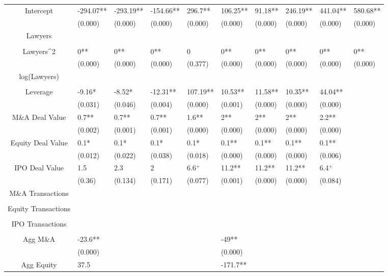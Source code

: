 \documentclass{article}
\begin{document}
\begin{table}[H]
\begin{tabular}{|clllllllll|}
Intercept & -294.07** & -293.19** & -154.66** & 296.7** & 106.25** & 91.18** & 246.19** & 441.04** & 580.68** \\ 
   & (0.000) & (0.000) & (0.000) & (0.000) & (0.000) & (0.000) & (0.000) & (0.000) & (0.000) \\ 
  Lawyers &  &  &  &  &  &  &  &  &  \\ 
   &  &  &  &  &  &  &  &  &  \\ 
  Lawyers^2 & 0** & 0** & 0** & 0 & 0** & 0** & 0** & 0** & 0** \\ 
   & (0.000) & (0.000) & (0.000) & (0.377) & (0.000) & (0.000) & (0.000) & (0.000) & (0.000) \\ 
  log(Lawyers) &  &  &  &  &  &  &  &  &  \\ 
   &  &  &  &  &  &  &  &  &  \\ 
  Leverage & -9.16* & -8.52* & -12.31** & 107.19** & 10.53** & 11.58** & 10.35** & 44.04** &  \\ 
   & (0.031) & (0.046) & (0.004) & (0.000) & (0.001) & (0.000) & (0.000) & (0.000) &  \\ 
  M\&A Deal Value & 0.7** & 0.7** & 0.7** & 1.6** & 2** & 2** & 2** & 2.2** &  \\ 
   & (0.002) & (0.001) & (0.001) & (0.000) & (0.000) & (0.000) & (0.000) & (0.000) &  \\ 
  Equity Deal Value & 0.1* & 0.1* & 0.1* & 0.1* & 0.1** & 0.1** & 0.1** & 0.1** &  \\ 
   & (0.012) & (0.022) & (0.038) & (0.018) & (0.000) & (0.000) & (0.000) & (0.006) &  \\ 
  IPO Deal Value & 1.5 & 2.3 & 2 & 6.6$^{+}$ & 11.2** & 11.2** & 11.2** & 6.4$^{+}$ &  \\ 
   & (0.36) & (0.134) & (0.171) & (0.077) & (0.001) & (0.000) & (0.000) & (0.084) &  \\ 
  M\&A Transactions &  &  &  &  &  &  &  &  &  \\ 
   &  &  &  &  &  &  &  &  &  \\ 
  Equity Transactions &  &  &  &  &  &  &  &  &  \\ 
   &  &  &  &  &  &  &  &  &  \\ 
  IPO Transactions &  &  &  &  &  &  &  &  &  \\ 
   &  &  &  &  &  &  &  &  &  \\ 
  Agg M\&A & -23.6** &  &  &  & -49** &  &  &  &  \\ 
   & (0.000) &  &  &  & (0.000) &  &  &  &  \\ 
  Agg Equity & 37.5 &  &  &  & -171.7** &  &  &  &  \\ 

\end{tabular}
\end{table}
\end{document}
